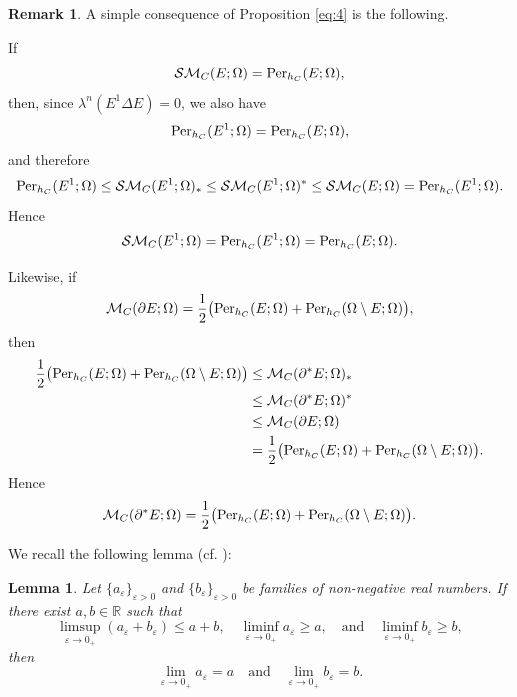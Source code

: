 \documentclass[pdflatex,sn-mathphys-num]{sn-jnl}
\theoremstyle{plain}
\newtheorem{lemma}[theorem]{Lemma}
\theoremstyle{definition}
\newtheorem{rem}[theorem]{Remark}
\begin{document}
\begin{rem}\label{EWQ}
A simple consequence of Proposition \ref{eq:4} is the following.

If
\[
\mathcal{SM}_C(E; \Omega)=\textup{Per}_{h_C}(E; \Omega),
\]
then, since $\lambda^n(E^1\Delta E)=0$, we also have
\[
\textup{Per}_{h_C}(E^1; \Omega)=\textup{Per}_{h_C}(E; \Omega),
\]
and therefore
\[
\textup{Per}_{h_C}(E^1; \Omega)\leq \mathcal{SM}_{C}(E^1; \Omega)_*
\leq \mathcal{SM}_{C}(E^1; \Omega)^*
\leq \mathcal{SM}_C(E; \Omega)
=\textup{Per}_{h_C}(E^1; \Omega).
\]
Hence
\[
\mathcal{SM}_{C}(E^1; \Omega)=\textup{Per}_{h_C}(E^1; \Omega)=\textup{Per}_{h_C}(E; \Omega).
\]

Likewise, if
\[
\mathcal{M}_C(\partial E; \Omega)=\frac{1}{2}\big(\textup{Per}_{h_C}(E; \Omega)+\textup{Per}_{h_C}(\Omega\setminus E; \Omega)\big),
\]
then
\begin{equation*}
\begin{split}
\frac{1}{2}\big(\textup{Per}_{h_C}(E; \Omega)+\textup{Per}_{h_C}(\Omega\setminus E; \Omega)\big)
&\leq \mathcal{M}_C(\partial^* E; \Omega)_*\\
&\leq \mathcal{M}_C(\partial^* E; \Omega)^*\\
&\leq \mathcal{M}_C(\partial E; \Omega)\\
&= \frac{1}{2}\big(\textup{Per}_{h_C}(E; \Omega)+\textup{Per}_{h_C}(\Omega\setminus E; \Omega)\big).
\end{split}
\end{equation*}
Hence
\[
\mathcal{M}_C(\partial^* E; \Omega)
=\frac{1}{2}\big(\textup{Per}_{h_C}(E; \Omega)+\textup{Per}_{h_C}(\Omega\setminus E; \Omega)\big).
\]
\end{rem}

\medskip

We recall the following lemma (cf. \cite[Lemma 1]{Villa4}):

\begin{lemma}\label{van}
Let $\{a_{\varepsilon}\}_{\varepsilon>0}$ and $\{b_{\varepsilon}\}_{\varepsilon>0}$ be families of non-negative real numbers. If there exist $a, b\in\mathbb{R}$ such that
\[
    \limsup_{\varepsilon\to0_+}(a_{\varepsilon}+b_{\varepsilon})\leq a+b, \quad 
    \liminf_{\varepsilon\to0_+}a_{\varepsilon}\geq a, \quad 
    \text{and} \quad \liminf_{\varepsilon\to0_+}b_{\varepsilon}\geq b,
\]
then
\[
    \lim_{\varepsilon\to0_+} a_{\varepsilon}=a \quad \text{and} \quad \lim_{\varepsilon\to0_+} b_{\varepsilon}=b.
\]
\end{lemma}

\medskip
\end{document}

